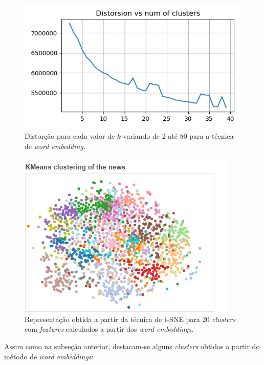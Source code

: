 \documentclass[10pt,twocolumn,letterpaper]{article}
\begin{document}
\begin{figure}
    \centering
    \includegraphics[width=\columnwidth]{figs/elbow_kmeans_embedded_1-5}
    \caption{Distorção para cada valor de \(k\) variando de 2 até 80 para a técnica de \textit{word embedding}.}
    \label{img:kmeans_embedded}
\end{figure}

\begin{figure}
    \centering
    \includegraphics[width=\columnwidth]{figs/bokeh_plot_embedded_1-5_svd_no_legend}
    \caption{Representação obtida a partir da técnica de t-SNE para 20 \textit{clusters} com \textit{features} calculados a partir dos \textit{word embeddings}.}
    \label{img:tsne_embedded}
\end{figure}

Assim como na subseção anterior, destacam-se alguns \textit{clusters} obtidos a partir do método de \textit{word embeddings}:
\end{document}
